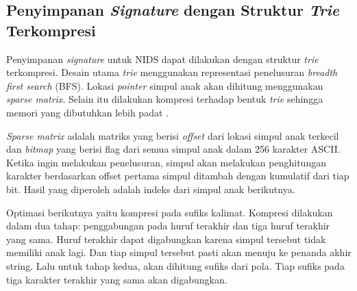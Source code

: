   \subsection{Penyimpanan \emph{Signature} dengan Struktur \emph{Trie} Terkompresi}

    Penyimpanan \emph{signature} untuk NIDS dapat dilakukan dengan struktur \emph{trie} terkompresi. Desain utama \emph{trie} menggunakan representasi penelusuran \emph{breadth first search} (BFS). Lokasi \emph{pointer} simpul anak akan dihitung menggunakan \emph{sparse matrix}. Selain itu dilakukan kompresi terhadap bentuk \emph{trie} sehingga memori yang dibutuhkan lebih padat \citep{bellekens2014}.

    \emph{Sparse matrix} adalah matriks yang berisi \emph{offset} dari lokasi simpul anak terkecil dan \emph{bitmap} yang berisi flag dari semua simpul anak dalam 256 karakter ASCII. Ketika ingin melakukan penelusuran, simpul akan melakukan penghitungan karakter berdasarkan offset pertama simpul ditambah dengan kumulatif dari tiap bit. Hasil yang diperoleh adalah indeks dari simpul anak berikutnya.

    Optimasi berikutnya yaitu kompresi pada sufiks kalimat. Kompresi dilakukan dalam dua tahap: penggabungan pada huruf terakhir dan tiga huruf terakhir yang sama. Huruf terakhir dapat digabungkan karena simpul tersebut tidak memiliki anak lagi. Dan tiap simpul tersebut pasti akan menuju ke penanda akhir string. Lalu untuk tahap kedua, akan dihitung sufiks dari pola. Tiap sufiks pada tiga karakter terakhir yang sama akan digabungkan.
    



